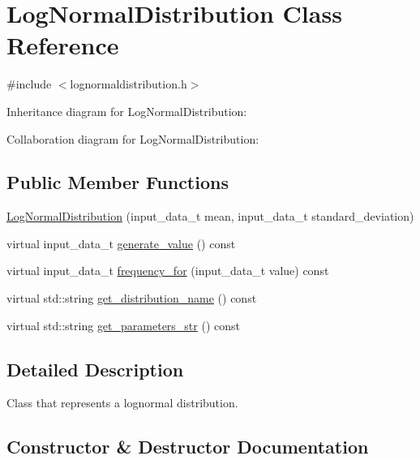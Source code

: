 \hypertarget{classLogNormalDistribution}{}\section{Log\+Normal\+Distribution Class Reference}
\label{classLogNormalDistribution}


{\ttfamily \#include $<$lognormaldistribution.\+h$>$}



Inheritance diagram for Log\+Normal\+Distribution\+:


Collaboration diagram for Log\+Normal\+Distribution\+:
\subsection*{Public Member Functions}
\begin{DoxyCompactItemize}
\item 
\hyperlink{classLogNormalDistribution_aa19384628632f1261ed28cdb9a21cbfe}{Log\+Normal\+Distribution} (input\+\_\+data\+\_\+t mean, input\+\_\+data\+\_\+t standard\+\_\+deviation)
\item 
virtual input\+\_\+data\+\_\+t \hyperlink{classLogNormalDistribution_a3c4f651b46cfec8372671ab32889a0c7}{generate\+\_\+value} () const
\item 
virtual input\+\_\+data\+\_\+t \hyperlink{classLogNormalDistribution_aa4a17cea478421db3a75e0728a63c371}{frequency\+\_\+for} (input\+\_\+data\+\_\+t value) const
\item 
virtual std\+::string \hyperlink{classLogNormalDistribution_a05e474accd65f523749011fbc8b42b65}{get\+\_\+distribution\+\_\+name} () const
\item 
virtual std\+::string \hyperlink{classLogNormalDistribution_a5dfd7c43d883d868dab5d62e55a7e610}{get\+\_\+parameters\+\_\+str} () const
\end{DoxyCompactItemize}


\subsection{Detailed Description}
Class that represents a lognormal distribution. 

\subsection{Constructor \& Destructor Documentation}
\mbox{\label{classLogNormalDistribution_aa19384628632f1261ed28cdb9a21cbfe}} 
